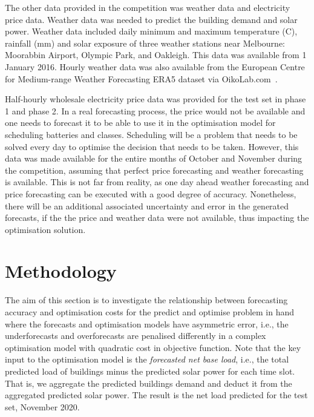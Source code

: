 \documentclass[conference]{IEEEtran}
\begin{document}
The other data provided in the competition was weather data and electricity price data. Weather data was needed to predict the building demand and solar power. Weather data included daily minimum and maximum temperature (C), rainfall (mm) and solar exposure of three weather stations near Melbourne: Moorabbin Airport, Olympic Park, and Oakleigh. This data was available from 1 January 2016. Hourly weather data was also available from the European Centre for Medium-range Weather Forecasting ERA5 dataset via OikoLab.com~\cite{hersbach2018era5}.

Half-hourly wholesale electricity price data was provided for the test set in phase 1 and phase 2. In a real forecasting process, the price would not be available and one needs to forecast it to be able to use it in the optimisation model for scheduling batteries and classes. Scheduling will be a problem that needs to be solved every day to optimise the decision that needs to be taken.  However, this data was made available for the entire months of October and November during the competition, assuming that perfect price forecasting and weather forecasting is available. This is not far from reality, as one day ahead weather forecasting and price forecasting can be executed with a good degree of accuracy. Nonetheless, there will be an additional associated uncertainty and error in the generated forecasts, if the the price and weather data were not available, thus impacting the optimisation solution. 

\section{Methodology}
The aim of this section is to investigate the relationship between forecasting accuracy and optimisation costs for the predict and optimise problem in hand where the forecasts and optimisation models have asymmetric error, i.e., the underforecasts and overforecasts are penalised differently in a complex optimisation model with quadratic cost in objective function. 
Note that the key input to the optimisation model is the \textit{forecasted net base load}, i.e., the total predicted load of buildings minus the predicted solar power for each time slot. That is, we aggregate the predicted buildings demand and deduct it from the aggregated predicted solar power. The result is the net load predicted for the test set, November 2020.  
\end{document}
